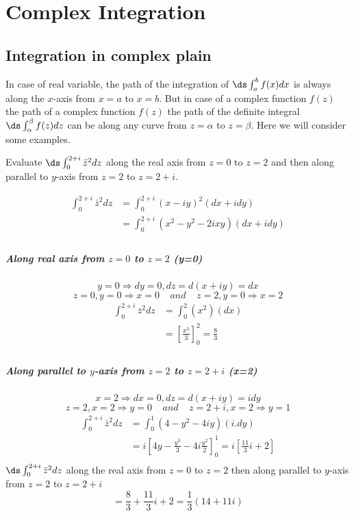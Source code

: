 \chapter{Complex Integration}
\section{Integration in complex plain}
In case of real variable, the path of the integration of $\ds \int_a^b f(x)dx$ is always along the $x$-axis from $x=a$ to $x=b$. But in case of a complex function $f(z)$ the path of a complex function $f(z)$ the path of the definite integral $\ds \int_{\alpha}^{\beta} f(z)dz$ can be along any curve from $z=\alpha$ to $z=\beta$. Here we will consider some examples.
\begin{example}
Evaluate $\ds \int_{0}^{2+i} \bar{z}^2 dz$ along the real axis from $z=0$ to $z=2$ and then along parallel to $y$-axis from $z=2$ to $z=2+i$.
\end{example}
\begin{solution}
\begin{align*}
	\int_{0}^{2+i} \bar{z}^2 dz		&= \int_{0}^{2+i} (x-iy)^2 (dx+idy)\\
																&= \int_{0}^{2+i} (x^2-y^2-2ixy) (dx+idy)\\
\end{align*}
\paragraph{Along real axis from $z=0$ to $z=2$ (y=0)}
\[y=0 \Rightarrow dy=0, dz = d(x+iy) = dx\]
\[z=0, y=0 \Rightarrow x=0~~~~~and~~~~~z=2, y=0 \Rightarrow x=2\]
\begin{align*}
	\int_{0}^{2+i} \bar{z}^2 dz		&= \int_{0}^{2} (x^2) (dx)\\
	&= \left[\frac{x^3}{3} \right]_0^2 = \frac{8}{3}\\
\end{align*}
\paragraph{Along parallel to $y$-axis from $z=2$ to $z=2+i$ (x=2)}
\[x=2 \Rightarrow dx=0, dz = d(x+iy) = idy\]
\[z=2, x=2 \Rightarrow y=0~~~~~and~~~~~z=2+i, x=2 \Rightarrow y=1\]
\begin{align*}
	\int_{0}^{2+i} \bar{z}^2 dz		&= \int_{0}^{1} (4-y^2-4iy) (i.dy)\\
	&= i \left[4y - \frac{y^3}{3} - 4i\frac{y^2}{2} \right]_0^1 =i\left[\frac{11}{3}i + 2\right]\\
\end{align*}
$\ds \int_{0}^{2+i} \bar{z}^2 dz$ along the real axis from $z=0$ to $z=2$ then along parallel to $y$-axis from $z=2$ to $z=2+i$
\[= \frac{8}{3} +  \frac{11}{3}i + 2  = \frac{1}{3}(14+11i)\]
\end{solution}
